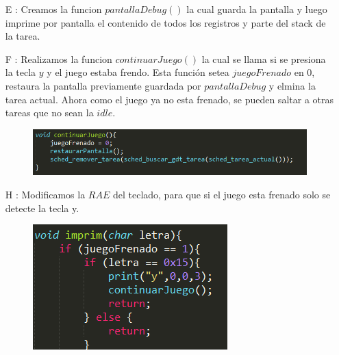 \begin{itemize}
\item[E]: Creamos la funcion $pantallaDebug()$ la cual guarda la pantalla y luego imprime por pantalla el contenido de todos los registros y parte del stack de la tarea.


\item[F]: Realizamos la funcion $continuarJuego()$ la cual se llama si se presiona la tecla $y$ y el juego estaba frendo. Esta función setea $juegoFrenado$ en 0, restaura la pantalla previamente guardada por $pantallaDebug$ y elmina la tarea actual. Ahora como el juego ya no esta frenado, se pueden saltar a otras tareas que no sean la $idle$.

\begin{figure}[H]
\begin{center}
\includegraphics[width=\linewidth]{ejercicio7/continuar.png}
\endminipage
\end{center}
\end{figure}

\item[H]: Modificamos la $RAE$ del teclado, para que si el juego esta frenado solo se detecte la tecla y.

\begin{figure}[H]
\begin{center}
\includegraphics[width=\linewidth]{ejercicio7/teclay.png}
\endminipage
\end{center}
\end{figure}

\end{itemize}












